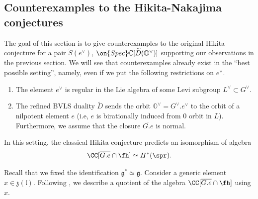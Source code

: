 \documentclass[12pt]{amsart}
\begin{document}
\subsection{Counterexamples to the Hikita-Nakajima conjectures} The goal of this section is to give counterexamples to the original Hikita conjecture for a pair $\widetilde{S}(e^\vee)$, $\on{Spec}\mathbb{C}[\widetilde{D}(\mathbb{O}^\vee)]$ supporting our observations in the previous section. We will see that counterexamples already exist in the ``best possible setting'', namely, even if we put the following restrictions on $e^\vee$.
\begin{enumerate}
    \item\label{ass_1} The element $e^\vee$ is regular in the Lie algebra of some Levi subgroup $L^\vee \subset G^\vee$. 
    \item\label{ass_2}  The refined BVLS duality $\widetilde{D}$ sends the orbit ${\mathbb{O}}^\vee=G^\vee. e^\vee$ to the orbit of a nilpotent element $e$ (i.e,  $e$ is birationally induced from $0$ orbit in $L$). Furthermore, we assume that the closure $\overline{G.e}$ is normal.
\end{enumerate}

In this setting, the classical Hikita conjecture predicts an isomorphism of algebra
\begin{equation} %
    \CC[\overline{G.e}\cap \fh]\simeq H^*(\spr).
\end{equation}





Recall that we fixed the identification $\mathfrak{g}^* \simeq \mathfrak{g}$. Consider a generic element $x \in \mathfrak{z}(\mathfrak{l})$. Following \cite[Proposition 4]{conjugacyclass}, we describe a quotient of the algebra $\CC[\overline{G.e}\cap \fh]$ using $x$.
\end{document}
